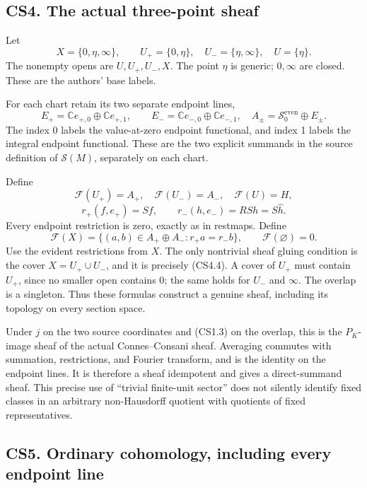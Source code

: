 \subsection{CS4. The actual three-point
sheaf}\label{cs4.-the-actual-three-point-sheaf}

Let \[
X=\{0,\eta,\infty\},\qquad
U_+=\{0,\eta\},\quad U_-=\{\eta,\infty\},\quad
U=\{\eta\}.
\tag{CS4.1}
\] The nonempty opens are \(U,U_+,U_-,X\). The point \(\eta\) is
generic; \(0,\infty\) are closed. These are the authors' base labels.

For each chart retain its two separate endpoint lines, \[
E_+=\mathbb C e_{+,0}\oplus\mathbb C e_{+,1},\qquad
E_-=\mathbb C e_{-,0}\oplus\mathbb C e_{-,1},
\quad
A_\pm=\mathcal S_0^{\mathrm{even}}\oplus E_\pm.
\tag{CS4.2}
\] The index 0 labels the value-at-zero endpoint functional, and index 1
labels the integral endpoint functional. These are the two explicit
summands in the source definition of \(\mathcal S(M)\), separately on
each chart.

Define \[
\mathscr F(U_+)=A_+,\quad
\mathscr F(U_-)=A_-,\quad
\mathscr F(U)=H,
\] \[
r_+(f,e_+)=S f,\qquad
r_-(h,e_-)=R S h=S\widehat h.
\tag{CS4.3}
\] Every endpoint restriction is zero, exactly as in restmaps. Define \[
\mathscr F(X)=\{(a,b)\in A_+\oplus A_-:r_+a=r_-b\},
\qquad \mathscr F(\varnothing)=0.
\tag{CS4.4}
\] Use the evident restrictions from \(X\). The only nontrivial sheaf
gluing condition is the cover \(X=U_+\cup U_-\), and it is precisely
(CS4.4). A cover of \(U_+\) must contain \(U_+\), since no smaller open
contains 0; the same holds for \(U_-\) and \(\infty\). The overlap is a
singleton. Thus these formulas construct a genuine sheaf, including its
topology on every section space.

Under \(j\) on the two source coordinates and (CS1.3) on the overlap,
this is the \(P_K\)-image sheaf of the actual Connes--Consani sheaf.
Averaging commutes with summation, restrictions, and Fourier transform,
and is the identity on the endpoint lines. It is therefore a sheaf
idempotent and gives a direct-summand sheaf. This precise use of
``trivial finite-unit sector'' does not silently identify fixed classes
in an arbitrary non-Hausdorff quotient with quotients of fixed
representatives.

\subsection{CS5. Ordinary cohomology, including every endpoint
line}\label{cs5.-ordinary-cohomology-including-every-endpoint-line}

